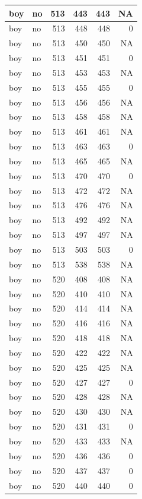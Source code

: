 \documentclass[man]{apa6}
\begin{document}
\begin{tabular}{l|l|r|r|r|r}
\hline
boy & no & 513 & 443 & 443 & NA\\
\hline
boy & no & 513 & 448 & 448 & 0\\
\hline
boy & no & 513 & 450 & 450 & NA\\
\hline
boy & no & 513 & 451 & 451 & 0\\
\hline
boy & no & 513 & 453 & 453 & NA\\
\hline
boy & no & 513 & 455 & 455 & 0\\
\hline
boy & no & 513 & 456 & 456 & NA\\
\hline
boy & no & 513 & 458 & 458 & NA\\
\hline
boy & no & 513 & 461 & 461 & NA\\
\hline
boy & no & 513 & 463 & 463 & 0\\
\hline
boy & no & 513 & 465 & 465 & NA\\
\hline
boy & no & 513 & 470 & 470 & 0\\
\hline
boy & no & 513 & 472 & 472 & NA\\
\hline
boy & no & 513 & 476 & 476 & NA\\
\hline
boy & no & 513 & 492 & 492 & NA\\
\hline
boy & no & 513 & 497 & 497 & NA\\
\hline
boy & no & 513 & 503 & 503 & 0\\
\hline
boy & no & 513 & 538 & 538 & NA\\
\hline
boy & no & 520 & 408 & 408 & NA\\
\hline
boy & no & 520 & 410 & 410 & NA\\
\hline
boy & no & 520 & 414 & 414 & NA\\
\hline
boy & no & 520 & 416 & 416 & NA\\
\hline
boy & no & 520 & 418 & 418 & NA\\
\hline
boy & no & 520 & 422 & 422 & NA\\
\hline
boy & no & 520 & 425 & 425 & NA\\
\hline
boy & no & 520 & 427 & 427 & 0\\
\hline
boy & no & 520 & 428 & 428 & NA\\
\hline
boy & no & 520 & 430 & 430 & NA\\
\hline
boy & no & 520 & 431 & 431 & 0\\
\hline
boy & no & 520 & 433 & 433 & NA\\
\hline
boy & no & 520 & 436 & 436 & 0\\
\hline
boy & no & 520 & 437 & 437 & 0\\
\hline
boy & no & 520 & 440 & 440 & 0\\

\end{tabular}
\end{document}

